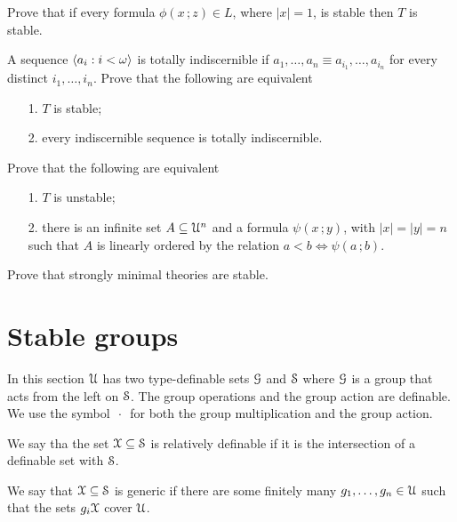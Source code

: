 \documentclass[creche.tex]{subfiles}
\begin{document}
\begin{exercise}
  Prove that if every formula $\phi(x\,;z)\in L$, where $|x|=1$, is stable then $T$ is stable.\QED
\end{exercise}

\begin{exercise} 
  A sequence $\<a_i:i<\omega\>$ is totally indiscernible if $a_1,\dots,a_n\equiv a_{i_1},\dots,a_{i_n}$ for every distinct $i_1,\dots,i_n$.
  Prove that the following are equivalent
  \begin{itemize}
  \item[1.] $T$ is stable;
  \item[2.] every indiscernible sequence is totally indiscernible.\QED
  \end{itemize}
\end{exercise}

\begin{exercise}\label{ex_stable_orderproperty}
Prove that the following are equivalent
\begin{itemize}
\item[1.] $T$ is unstable;
\item[2.] there is an infinite set $A\subseteq\U^n$ and a formula  $\psi(x\,;y)$, with $|x|=|y|=n$ such that $A$ is linearly ordered by the relation $a<b\iff\psi(a\,;b)$.\QED
\end{itemize}
\end{exercise}

\begin{exercise}
Prove that strongly minimal theories are stable.\QED
\end{exercise}

\section{Stable groups}

In this section $\U$ has two type-definable sets $\G$ and $\S$ where $\G$ is a group that acts from the left on $\S$.
The group operations and the group action are definable.
We use the symbol $\,\cdot\,$ for both the group multiplication and the group action.

We say tha the set $\X\subseteq\S$ is relatively definable if it is the intersection of a definable set with $\S$.

We say that $\X\subseteq\S$ is generic if there are some finitely many $g_1,\dots,g_n\in\U$ such that the sets $g_i\X$ cover $\U$.
\end{document}
